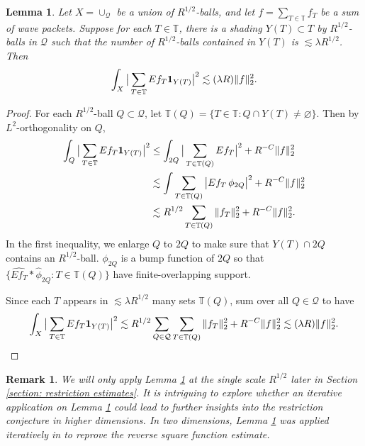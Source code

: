 \documentclass{amsart}
\numberwithin{equation}{section}
\newtheorem{lemma}[theorem]{Lemma}
\newtheorem{remark}[theorem]{Remark}
\newcommand{\la}{\lambda}
\newcommand{\cq}{\mathcal Q}
\newcommand{\ZT}{\mathbb{T}}
\newcommand{\Id}{{\bf 1}}
\newcommand{\cQ}{{\mathcal Q}}
\begin{document}
\begin{lemma}
\label{lem: l2}
Let $X=\cup_{\cq}$ be a union of $R^{1/2}$-balls, and let $f=\sum_{T\in\ZT}f_T$ be a sum of wave packets.
Suppose for each $T\in \ZT$, there is a shading $Y(T)\subset T$ by $R^{1/2}$-balls in $\cq$ such that the number of $R^{1/2}$-balls contained in $Y(T)$ is $\lesssim \lambda R^{1/2}$.
Then
\begin{equation}
\label{l2}
    \int_{X}\big|\sum_{T\in\ZT}Ef_{T}\Id_{Y(T)}\big|^2\lesssim (\la R)\|f\|_2^2.
\end{equation}
\end{lemma}
\begin{proof}

For each $R^{1/2}$-ball $Q\subset \cQ$, let $\ZT(Q)=\{ T\in\ZT:   Q\cap  Y(T)\neq \varnothing \}$. 
Then by $L^2$-orthogonality on $Q$, 
\begin{align}
    \int_Q \big|\sum_{T\in\ZT}Ef_{T}\Id_{Y(T)}\big|^2 & \leq \int_{2Q} \big|\sum_{T\in \ZT(Q)}Ef_{T}\big|^2 +R^{-C}\|f\|_{2}^2\\
    & \lesssim \int \sum_{T\in\ZT(Q)}\big| Ef_{T} \, \phi_{2Q}\big|^2 +R^{-C}\|f\|_{2}^2  \\
    &\lesssim  R^{1/2} \sum_{T\in \ZT(Q)} \|f_T\|_{2}^2+R^{-C}\|f\|_{2}^2 . 
\end{align}
In the first inequality, we enlarge $Q$ to $2Q$ to make sure that $Y(T) \cap 2Q$ contains an $R^{1/2}$-ball.
$\phi_{2Q}$ is a bump function of $2Q$ so that $\{ \widehat{Ef_T } \ast \widehat{\phi}_{2Q}: T\in \ZT(Q)\}$ have finite-overlapping support. 

Since each $T$ appears in $\lesssim \lambda R^{1/2}$ many sets $\ZT(Q)$, sum over all $Q\in \cQ$ to have
\begin{equation}
    \int_{X}\big|\sum_{T\in\ZT}Ef_{T}\Id_{Y(T)}\big|^2 \lesssim R^{1/2} \sum_{Q\in \cQ} \sum_{T\in \ZT(Q)} \|f_T\|_{2}^2+R^{-C}\|f\|_{2}^2 \lesssim (\lambda R) \|f\|_{2}^2. \qedhere
\end{equation}
\end{proof}

\begin{remark}

\rm

We will only apply Lemma \ref{lem: l2} at the single scale $R^{1/2}$ later in Section \ref{section: restriction estimates}. 
It is intriguing to explore whether an iterative application on Lemma \ref{lem: l2} could lead to further insights into the restriction conjecture in higher dimensions.
In two dimensions, Lemma \ref{lem: l2} was applied iteratively in \cite{Li-Wu} to reprove the reverse square function estimate.
\end{remark}
\end{document}
